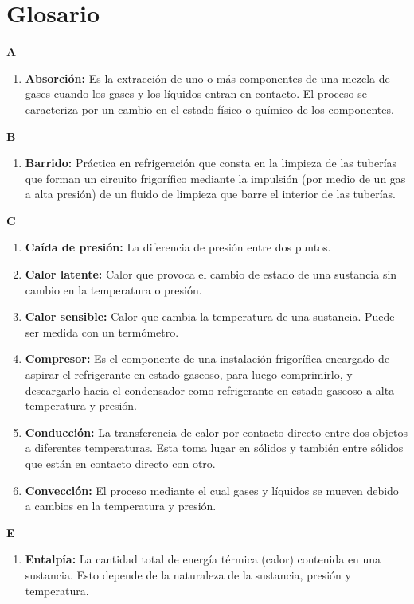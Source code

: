 \chapter*{Glosario}
\textbf{A}
\begin{enumerate}[label={ },leftmargin=*]
	\item \textbf{Absorción:} Es la extracción de uno o más componentes de una mezcla de gases cuando los gases y los líquidos entran en contacto. El proceso se caracteriza por un cambio en el estado físico o químico de los componentes.
\end{enumerate}

\textbf{B}
\begin{enumerate}[label={ },leftmargin=*]
	\item \textbf{Barrido:} Práctica en refrigeración que consta en la limpieza de las tuberías que forman un circuito frigorífico mediante la impulsión (por medio de un gas a alta presión) de un fluido de limpieza que barre el interior de las tuberías.
\end{enumerate}

\textbf{C}
\begin{enumerate}[label={ },leftmargin=*]
	\item \textbf{Caída de presión:} La diferencia de presión entre dos puntos.
	\item \textbf{Calor latente:} Calor que provoca el cambio de estado de una sustancia sin cambio en la temperatura o presión.
	\item \textbf{Calor sensible:} Calor que cambia la temperatura de una sustancia. Puede ser medida con un termómetro.
	\item \textbf{Compresor:} Es el componente de una instalación frigorífica encargado de aspirar el refrigerante en estado gaseoso, para luego comprimirlo, y descargarlo hacia el condensador como refrigerante en estado gaseoso a alta temperatura y presión.
	\item \textbf{Conducción:} La transferencia de calor por contacto directo entre dos objetos a diferentes temperaturas. Esta toma lugar en sólidos y también entre sólidos que están en contacto directo con otro.
	\item \textbf{Convección:} El proceso mediante el cual gases y líquidos se mueven debido a cambios en la temperatura y presión.
\end{enumerate}

\textbf{E}
\begin{enumerate}[label={ },leftmargin=*]
	\item \textbf{Entalpía:} La cantidad total de energía térmica (calor) contenida en una sustancia. Esto depende de la naturaleza de la sustancia, presión y temperatura.
\end{enumerate}

